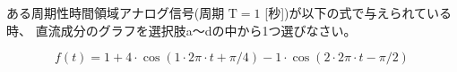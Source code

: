 ある周期性時間領域アナログ信号(周期 $\textrm{T} = 1$ [秒])が以下の式で与えられている時、
直流成分のグラフを選択肢a〜dの中から1つ選びなさい。

\[
f(t) = 
1
+ 4 \cdot \cos( 1 \cdot 2 \pi \cdot t + \pi/4 )
- 1 \cdot \cos( 2 \cdot 2 \pi \cdot t - \pi/2 )
\]
